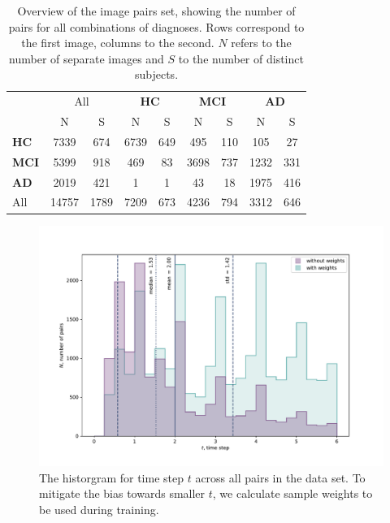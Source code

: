 \begin{table}
	\begin{center}
		\begin{tabular}{l c c | c c c c c c}
			\toprule
			& 
			\multicolumn{2}{c}{All} &
			\multicolumn{2}{c}{\bfseries HC} & 
			\multicolumn{2}{c}{\bfseries MCI} & 
			\multicolumn{2}{c}{\bfseries AD} \\
			\cmidrule(lr){2-3}
			\cmidrule(lr){4-5}
			\cmidrule(lr){6-7}
			\cmidrule(lr){8-9}
			& N & \multicolumn{1}{c}{S} & N & S & N & S & N & S \\ 
			\cmidrule(lr){1-9}
			\bfseries HC  &  7339 &  674 & 6739 & 649 &  495 & 110 &  105 &  27 \\
			\bfseries MCI &  5399 &  918 &  469 &  83 & 3698 & 737 & 1232 & 331 \\
			\bfseries AD  &  2019 &  421 &    1 &   1 &   43 &  18 & 1975 & 416 \\
			\cmidrule(lr){1-9}
			All           & 14757 & 1789 & 7209 & 673 & 4236 & 794 & 3312 & 646 \\
			\bottomrule
		\end{tabular}
		\caption{Overview of the image pairs set, showing the number of pairs for all combinations of diagnoses. Rows correspond to the first image, columns to the second. $N$ refers to the number of separate images and $S$ to the number of distinct subjects.}
		\label{tab:pairsset}
	\end{center}
\end{table}

\begin{figure}[h]
	\centering
	\includegraphics[width=0.9\linewidth]{images/timestep_plots/hist} 
	\caption{The historgram for time step $t$ across all pairs in the data set. To mitigate the bias towards smaller $t$, we calculate sample weights to be used during training.}
	\label{fig:timestephist}
\end{figure}


